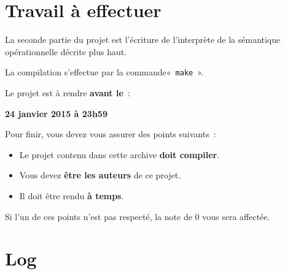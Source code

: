 \documentclass[a4paper,8pt]{article}
\newlength\codewidth
\newenvironment{code}[1][\codewidth]{
\begin{center}
\Sbox
\hspace{0.3cm}\minipage{#1}\small
}{
\endminipage
\endSbox\fbox{\TheSbox}
\end{center}
}
\begin{document}
\section{Travail à effectuer}

La seconde partie du projet est l'écriture de l'interprète de
la sémantique opérationnelle décrite plus haut.

La compilation s'effectue par la commande«~\verb!make!~».

Le projet est à rendre \textbf{avant le}~:

\begin{code}
\begin{center}
\large\textbf{24 janvier 2015 à 23h59}
\end{center}
\end{code}

Pour finir, vous devez vous assurer des points suivants~:
\begin{code}
\begin{itemize}
\item Le projet contenu dans cette archive \textbf{doit compiler}.
\item Vous devez \textbf{être les auteurs} de ce projet.
\item Il doit être rendu \textbf{à temps}.
\end{itemize}
\end{code}

Si l'un de ces points n'est pas respecté, la note de $0$ vous sera affectée.

\section{Log}


\end{document}
